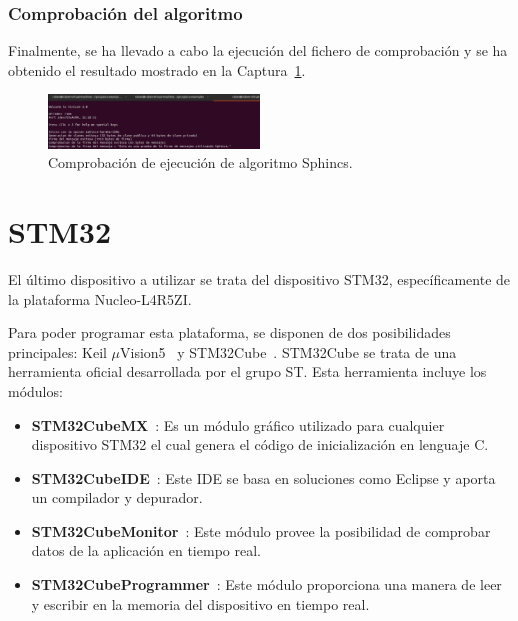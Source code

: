 \subsubsection{Comprobación del algoritmo}\label{subsubsec:sphincs-comp}

Finalmente, se ha llevado a cabo la ejecución del fichero de comprobación y se ha obtenido el resultado mostrado en la Captura~\ref{fig:sphincs-check}.

\begin{figure}[h]
    \centering
    \includegraphics[width=0.5\textwidth]{figures/sphincs-check.png}
    \caption{Comprobación de ejecución de algoritmo Sphincs.}
    \label{fig:sphincs-check}
\end{figure}



\section{STM32}\label{sec:stm32}

El último dispositivo a utilizar se trata del dispositivo STM32, específicamente de la plataforma Nucleo-L4R5ZI.

Para poder programar esta plataforma, se disponen de dos posibilidades principales: Keil $\mu$Vision5~\cite{keil} y STM32Cube~\cite{stm32cube}.
STM32Cube se trata de una herramienta oficial desarrollada por el grupo ST.
Esta herramienta incluye los módulos:

\begin{itemize}
    \item \textbf{STM32CubeMX}~\cite{stm32cubemx}: Es un módulo gráfico utilizado para cualquier dispositivo STM32 el cual genera el código de inicialización en lenguaje C.
    \item \textbf{STM32CubeIDE}~\cite{stm32cubeide}: Este \ac{IDE} se basa en soluciones como Eclipse y aporta un compilador y depurador.
    \item \textbf{STM32CubeMonitor}~\cite{stm32cubemonitor}: Este módulo provee la posibilidad de comprobar datos de la aplicación en tiempo real.
    \item \textbf{STM32CubeProgrammer}~\cite{stm32cubeprogrammer}: Este módulo proporciona una manera de leer y escribir en la memoria del dispositivo en tiempo real.
\end{itemize}

